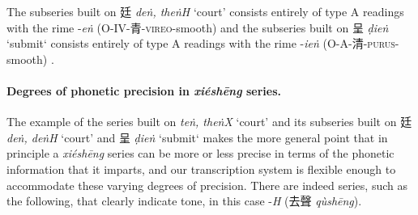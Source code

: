 \noindent The subseries built on 廷   \textit{deṅ, theṅH} `court' consists entirely of type A readings with the rime 
-\textit{eṅ} (O-IV-青-\textsc{vireo}-smooth) and the subseries built on 呈 \textit{ḍieṅ}
    `submit`
     consists entirely of type A readings with the rime 
-\textit{ieṅ} (O-A-清-\textsc{purus}-smooth) . 

\paragraph{Degrees of phonetic precision in \textit{xiéshēng} series.}
\label{par:precision-in-xiesheng}
The example of the series built on 
 \textit{teṅ, theṅX} `court'
and its subseries built on 
廷 \textit{deṅ, deṅH} `court'
and 
呈 \textit{ḍieṅ} `submit`
makes the more general point that in principle a \textit{xiéshēng} series can be more or less precise in terms of the phonetic information that it imparts, and our transcription system is flexible enough to accommodate these varying degrees of precision. There are indeed series, such as the following, that clearly indicate tone, in this case -\textit{H} (去聲 \textit{qùshēng}).

